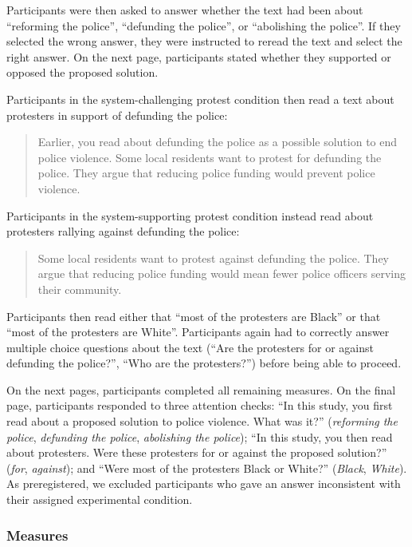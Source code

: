 \documentclass[12pt, letterpaper]{article}
\begin{document}
\noindent Participants were then asked to answer whether the text had
been about ``reforming the police'', ``defunding the police'', or
``abolishing the police''. If they selected the wrong answer, they were
instructed to reread the text and select the right answer. On the next
page, participants stated whether they supported or opposed the proposed
solution.

Participants in the system-challenging protest condition then read a
text about protesters in support of defunding the police:

\begin{quote}
Earlier, you read about defunding the police as a possible solution to
end police violence. Some local residents want to protest for defunding
the police. They argue that reducing police funding would prevent police
violence.
\end{quote}

\noindent Participants in the system-supporting protest condition
instead read about protesters rallying against defunding the police:

\begin{quote}
Some local residents want to protest against defunding the police. They
argue that reducing police funding would mean fewer police officers
serving their community.
\end{quote}

\noindent Participants then read either that ``most of the protesters
are Black'' or that ``most of the protesters are White''. Participants
again had to correctly answer multiple choice questions about the text
(``Are the protesters for or against defunding the police?'', ``Who are
the protesters?'') before being able to proceed.

On the next pages, participants completed all remaining measures. On the
final page, participants responded to three attention checks: ``In this
study, you first read about a proposed solution to police violence. What
was it?'' (\emph{reforming the police}, \emph{defunding the police},
\emph{abolishing the police}); ``In this study, you then read about
protesters. Were these protesters for or against the proposed
solution?'' (\emph{for}, \emph{against}); and ``Were most of the
protesters Black or White?'' (\emph{Black}, \emph{White}). As
preregistered, we excluded participants who gave an answer inconsistent
with their assigned experimental condition.

\hypertarget{measures-1}{%
\subsubsection{Measures}\label{measures-1}}
\end{document}
